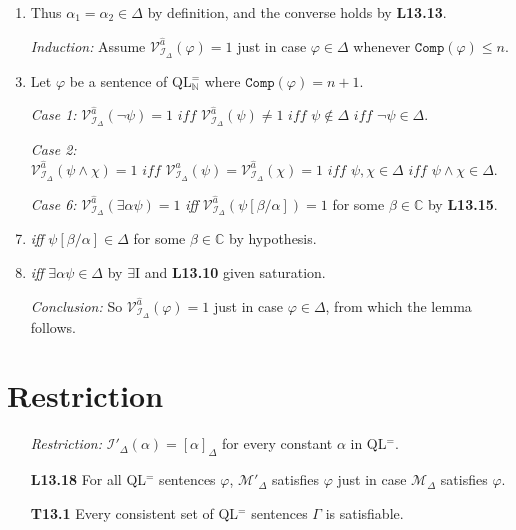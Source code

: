 \documentclass[a4paper, 11pt]{article} %
\newcommand{\I}{\mathcal{I}}
\newcommand{\M}{\mathcal{M}}
\newcommand{\N}{\mathbb{N}}
\newcommand{\C}{\mathbb{C}}
\newcommand{\comp}{\texttt{Comp}}
\newcommand{\VV}[2]{\mathcal{V}_{#1}^{#2}} %
\newcommand{\va}[1]{\hat{#1}} %
\newcommand{\qt}[2]{#1 #2} %
\newcommand{\unisub}[2]{[#1/#2]}
\def\metaA{\ensuremath{\varphi}}
\def\metaB{\ensuremath{\psi}}
\def\metaC{\ensuremath{\chi}}
\begin{document}
\begin{enumerate}
  \item Thus $\alpha_1=\alpha_2\in\Delta$ by definition, and the converse holds by \textbf{L13.13}.
  \item[\it Induction:] Assume $\VV{\I_\Delta}{\va{a}}(\metaA)=1$ just in case $\metaA\in\Delta$ whenever $\comp(\metaA)\leq n$.
    \setcounter{enumi}{0}
  \item Let $\metaA$ be a sentence of QL$^=_{\N}$ where $\comp(\metaA)=n+1$.
  \item[\it Case 1:]     
    $ \VV{\I_\Delta}{\va{a}}(\neg\metaB)=1
      \textit{ iff } \VV{\I_\Delta}{\va{a}}(\metaB)\neq 1
      \textit{ iff } \metaB\notin\Delta
      \textit{ iff } \neg\metaB\in\Delta.$
  \item[\it Case 2:]     
    $ \VV{\I_\Delta}{\va{a}}(\metaB\wedge\metaC)=1
      \textit{ iff } \VV{\I_\Delta}{\va{a}}(\metaB)=\VV{\I_\Delta}{\va{a}}(\metaC)=1 
      \textit{ iff } \metaB,\metaC\in\Delta 
      \textit{ iff } \metaB\wedge\metaC\in\Delta.$
  \item[\it Case 6:] $\VV{\I_\Delta}{\va{a}}(\qt{\exists}{\alpha}\metaB)=1$  \textit{iff} $\VV{\I_\Delta}{\va{a}}(\metaB\unisub{\beta}{\alpha})=1$ for some $\beta\in\C$ by \textbf{L13.15}.
    \setcounter{enumi}{0}
  \item \textit{iff} $\metaB\unisub{\beta}{\alpha}\in\Delta$ for some $\beta\in\C$ by hypothesis.
  \item \textit{iff} $\qt{\exists}{\alpha}\metaB\in\Delta$ by $\exists$I and \textbf{L13.10} given saturation.  
  \item[\it Conclusion:] So $\VV{\I_\Delta}{\va{a}}(\metaA)=1$ just in case $\metaA\in\Delta$, from which the lemma follows.
\end{enumerate}

\section*{Restriction}

\begin{enumerate}
  \item[\it Restriction:] $\I'_\Delta(\alpha)=[\alpha]_\Delta$ for every constant $\alpha$ in QL$^=$.
  \item[\bf L13.18] For all QL$^=$ sentences $\metaA$, $\M'_\Delta$ satisfies $\metaA$ just in case $\M_\Delta$ satisfies $\metaA$.
  \item[\bf T13.1] Every consistent set of QL$^=$ sentences $\Gamma$ is satisfiable.
\end{enumerate}
\end{document}

